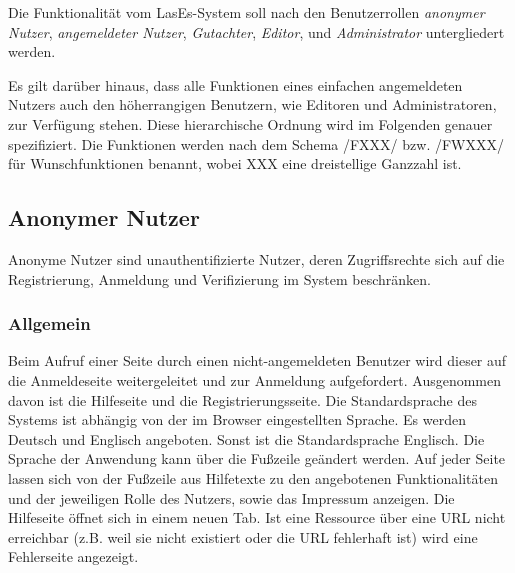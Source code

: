 

Die Funktionalität vom LasEs-System soll nach den Benutzerrollen
\textit{anonymer Nutzer}, \textit{angemeldeter Nutzer}, \textit{Gutachter}, \textit{Editor}, und
\textit{Administrator} untergliedert werden.

Es gilt darüber hinaus, dass alle Funktionen eines einfachen angemeldeten Nutzers auch den höherrangigen Benutzern, wie Editoren
und Administratoren, zur Verfügung stehen. Diese hierarchische Ordnung wird im Folgenden genauer spezifiziert.
Die Funktionen werden nach dem Schema /FXXX/ bzw. /FWXXX/ für Wunschfunktionen benannt, wobei XXX eine dreistellige Ganzzahl ist.

\subsection{Anonymer Nutzer}\label{funkt:nutzer}
Anonyme Nutzer sind unauthentifizierte Nutzer, deren Zugriffsrechte sich
auf die Registrierung, Anmeldung und Verifizierung im System beschränken.

\subsubsection{Allgemein}
\begin{description}
     Beim Aufruf einer Seite durch einen nicht-angemeldeten Benutzer
    wird dieser auf die Anmeldeseite weitergeleitet und zur
    Anmeldung aufgefordert. Ausgenommen davon ist die Hilfeseite und die Registrierungsseite.
     Die Standardsprache des Systems ist abhängig von der im Browser
    eingestellten Sprache. Es werden Deutsch und Englisch angeboten.
    Sonst ist die Standardsprache Englisch. Die Sprache der Anwendung kann über die
    Fußzeile geändert werden.
     Auf jeder Seite lassen sich von der Fußzeile aus
    Hilfetexte zu den angebotenen Funktionalitäten und der jeweiligen Rolle
    des Nutzers, sowie das Impressum anzeigen. Die Hilfeseite öffnet sich in einem neuen Tab.
     Ist eine Ressource über eine URL nicht erreichbar (z.B. weil sie nicht existiert oder
     die URL fehlerhaft ist) wird eine Fehlerseite angezeigt.%
\end{description}

